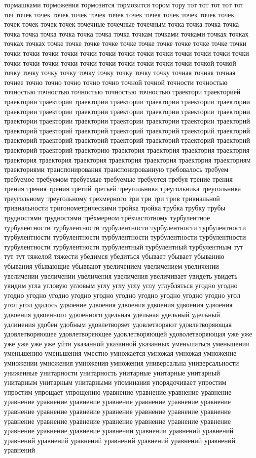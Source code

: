тормашками торможения тормозится тормозится тором тору тот тот тот тот тот точ точек точек точек точек точек точек точек точек точек точек точек точек точек точек точек точек точечные точечные точечным точка точка точка точка точка точка точка точка точка точка точка точкам точками точками точках точках точках точках точке точке точке точке точке точке точке точке точке точке точки точки точки точки точки точки точки точки точки точки точки точки точки точки точки точки точки точки точки точки точки точки точки точки точкой точкой точку точку точку точку точку точку точку точку точку точная точная точная точнее точно точно точно точно точно точной точной точности точностью точностью точностью точностью точностью точностью траектори траекторией траектории траектории траектории траектории траектории траектории траектории траектории траектории траектории траектории траектории траектории траектории траектории траектории траектории траектории траектории траектории траекторий траекторий траекторий траекторий траекторий траекторий траекторий траекторий траекторий траекторий траекторий траекторий траекторий траекторий траекторий траекторий траекторий траекторию траектория траектория траектория траектория траектория траектория траектория траектория траектория траектория траекториям траекториями транспонирования транспонированную требовалось требуем требуемое требуемом требуемые требуемые требуется требуя трение трения трения трения трения третий третьей треугольника треугольника треугольника треугольному треугольному трехмерного три три три трив тривиальной тривиальности тригонометрическими тройка тройка трубка трубку трубы трудностями трудностями трёхмерном трёхчастотному турбулентное турбулентности турбулентности турбулентности турбулентности турбулентности турбулентности турбулентности турбулентности турбулентности турбулентности турбулентности турбулентности турбулентный турбулентный турбулентным тут тут тут тяжелой тяжести убедимся убедиться убывает убывает убыванию убывания убывающие убыввают увеличением увеличением увеличении увеличении увеличении увеличения увеличения увеличивает увидеть увидеть увидим угла угловую угловым углу углу углу углу углубляться угодно угодно угодно угодно угодно угодно угодно угодно угодно угодно угодно угодно угол угол угол удалось удвоение удвоения удвоения удвоения удвоения удвоения удвоения удвоенного удвоенного удельная удельная удельный удельный удлинения удобен удобным удовлетворяет удовлетворяют удовлетворяющая удовлетворяющее удовлетворяющее удовлетворяющей удоволетворяющая уже уже уже уже уже уже уйти указанной указанной указанных уменьшаться уменьшении уменьшению уменьшения уместно умножается умножая умножая умножение умножении умножения умножения умножения универсальна универсальности униженные унитарности унитарность унитарные унитарные унитарный унитарным унитарным унитарными упоминания упорядочивает упростим упростим упрощает упрощению уравнение уравнение уравнение уравнение уравнение уравнение уравнение уравнение уравнение уравнение уравнение уравнение уравнение уравнение уравнение уравнение уравнение уравнение уравнение уравнение уравнение уравнение уравнение уравнение уравнение уравнение уравнение уравнение уравнении уравнении уравнений уравнений уравнений уравнений уравнений уравнений уравнений уравнений уравнений уравнений 